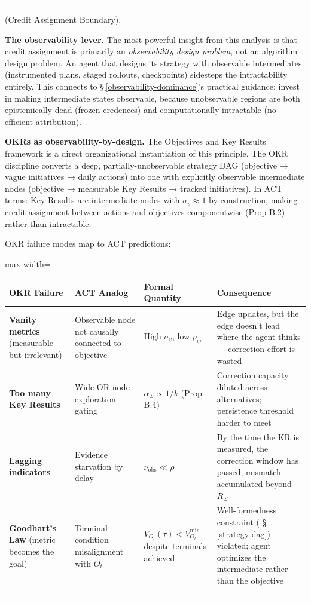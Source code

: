 \documentclass[11pt,oneside]{article}
\newcounter{claim}[section]
\renewcommand{\theclaim}{\thesection.\arabic{claim}}
\newenvironment{segment}[2]{%
  \refstepcounter{claim}%
  \bigskip\noindent\hrule\smallskip
  \noindent{\bfseries #1~\theclaim}\enskip(#2).\par\smallskip
  \noindent\ignorespaces
}{%
  \par\smallskip\noindent\hrule\bigskip
}
\newenvironment{discussion}[1][]{\begin{segment}{Discussion}{#1}}{\end{segment}}
\begin{document}
\begin{discussion}[Credit Assignment Boundary]
\textbf{The observability lever.} The most powerful insight from this analysis is that credit assignment is primarily an \textit{observability design problem}, not an algorithm design problem. An agent that designs its strategy with observable intermediates (instrumented plans, staged rollouts, checkpoints) sidesteps the intractability entirely. This connects to \S\,\ref{observability-dominance}'s practical guidance: invest in making intermediate states observable, because unobservable regions are both epistemically dead (frozen credences) and computationally intractable (no efficient attribution).

\textbf{OKRs as observability-by-design.} The Objectives and Key Results framework is a direct organizational instantiation of this principle. The OKR discipline converts a deep, partially-unobservable strategy DAG (objective → vague initiatives → daily actions) into one with explicitly observable intermediate nodes (objective → measurable Key Results → tracked initiatives). In ACT terms: Key Results are intermediate nodes with $\sigma_v \approx 1$ by construction, making credit assignment between actions and objectives componentwise (Prop B.2) rather than intractable.

OKR failure modes map to ACT predictions:

\begin{adjustbox}{max width=\textwidth}
\small
\begin{tabular}{llll}
\toprule
OKR Failure & ACT Analog & Formal Quantity & Consequence \\
\midrule
\textbf{Vanity metrics} (measurable but irrelevant) & Observable node not causally connected to objective & High $\sigma_v$, low $p_{ij}$ & Edge updates, but the edge doesn't lead where the agent thinks — correction effort is wasted \\
\textbf{Too many Key Results} & Wide OR-node exploration-gating & $\alpha_\Sigma \propto 1/k$ (Prop B.4) & Correction capacity diluted across alternatives; persistence threshold harder to meet \\
\textbf{Lagging indicators} & Evidence starvation by delay & $\nu_{\text{obs}} \ll \rho$ & By the time the KR is measured, the correction window has passed; mismatch accumulated beyond $R_\Sigma$ \\
\textbf{Goodhart's Law} (metric becomes the goal) & Terminal-condition misalignment with $O_t$ & $V_{O_t}(\tau) < V_{O_t}^{\min}$ despite terminals achieved & Well-formedness constraint ( \S\,\ref{strategy-dag}) violated; agent optimizes the intermediate rather than the objective \\
\bottomrule
\end{tabular}
\end{adjustbox}



\end{discussion}
\end{document}
